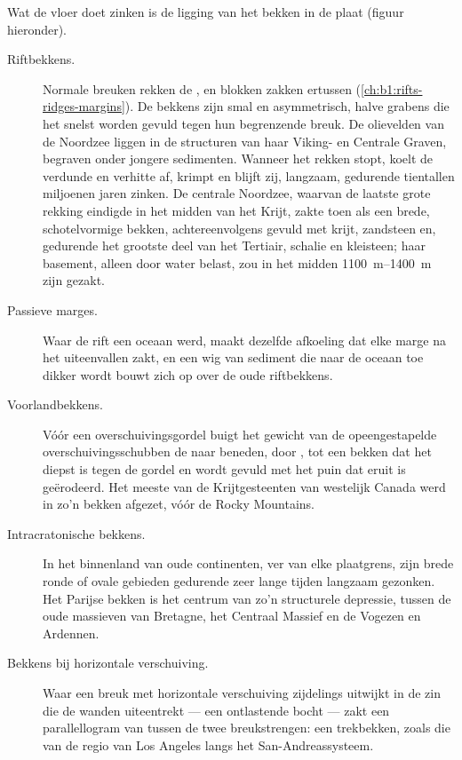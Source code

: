Wat de vloer doet zinken is de ligging van het bekken in de plaat (figuur hieronder).

\begin{description}
  \item[Riftbekkens.] Normale breuken rekken de , en blokken zakken ertussen (\cref{ch:b1:rifts-ridges-margins}). De bekkens zijn smal en asymmetrisch, halve grabens die het snelst worden gevuld tegen hun begrenzende breuk. De olievelden van de Noordzee liggen in de structuren van haar Viking- en Centrale Graven, begraven onder jongere sedimenten. Wanneer het rekken stopt, koelt de verdunde en verhitte  af, krimpt en blijft zij, langzaam, gedurende tientallen miljoenen jaren zinken. De centrale Noordzee, waarvan de laatste grote rekking eindigde in het midden van het Krijt, zakte toen als een brede, schotelvormige bekken, achtereenvolgens gevuld met krijt, zandsteen en, gedurende het grootste deel van het Tertiair, schalie en kleisteen; haar basement, alleen door water belast, zou in het midden \qtyrange{1100}{1400}{m} zijn gezakt.
  \item[Passieve marges.] Waar de rift een oceaan werd, maakt dezelfde afkoeling dat elke marge na het uiteenvallen zakt, en een wig van sediment die naar de oceaan toe dikker wordt bouwt zich op over de oude riftbekkens.
  \item[Voorlandbekkens.] Vóór een overschuivingsgordel buigt het gewicht van de opeengestapelde overschuivingsschubben de  naar beneden, door , tot een bekken dat het diepst is tegen de gordel en wordt gevuld met het puin dat eruit is geërodeerd. Het meeste van de Krijtgesteenten van westelijk Canada werd in zo'n bekken afgezet, vóór de Rocky Mountains.
  \item[Intracratonische bekkens.] In het binnenland van oude continenten, ver van elke plaatgrens, zijn brede ronde of ovale gebieden gedurende zeer lange tijden langzaam gezonken. Het Parijse bekken is het centrum van zo'n structurele depressie, tussen de oude massieven van Bretagne, het Centraal Massief en de Vogezen en Ardennen.
  \item[Bekkens bij horizontale verschuiving.] Waar een breuk met horizontale verschuiving zijdelings uitwijkt in de zin die de wanden uiteentrekt --- een ontlastende bocht --- zakt een parallellogram van  tussen de twee breukstrengen: een trekbekken, zoals die van de regio van Los Angeles langs het San-Andreassysteem.
\end{description}

